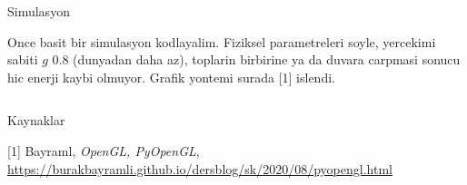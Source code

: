 \documentclass[12pt,fleqn]{article}\usepackage{../../common}
\begin{document}
Simulasyon

Once basit bir simulasyon kodlayalim. Fiziksel parametreleri soyle, yercekimi
sabiti $g$ 0.8 (dunyadan daha az), toplarin birbirine ya da duvara carpmasi
sonucu hic enerji kaybi olmuyor. Grafik yontemi surada [1] islendi. 

\inputminted[fontsize=\footnotesize]{python}{sim1.py}




Kaynaklar

[1] Bayraml, {\em OpenGL, PyOpenGL}, \url{https://burakbayramli.github.io/dersblog/sk/2020/08/pyopengl.html}
\end{document}
